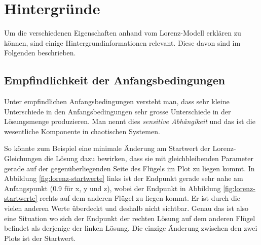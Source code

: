 
\section{Hintergründe}\label{backgroundinfo}
Um die verschiedenen Eigenschaften anhand vom Lorenz-Modell erklären zu können, sind einige Hintergrundinformationen relevant. Diese davon sind im Folgenden beschrieben.

\subsection{Empfindlichkeit der Anfangsbedingungen}
Unter empfindlichen Anfangsbedingungen versteht man, dass sehr kleine Unterschiede in den Anfangsbedingungen sehr grosse Unterschiede in der Lösungsmenge produzieren. Man nennt dies \textit{sensitive Abhängikeit} und das ist die wesentliche Komponente in chaotischen Systemen. 

So könnte zum Beispiel eine minimale Änderung am Startwert der Lorenz-Gleichungen die Lösung dazu bewirken, dass sie mit gleichbleibenden Parameter gerade auf der gegenüberliegenden Seite des Flügels im Plot zu liegen kommt. In Abbildung \ref{fig:lorenz-startwerte} links ist der Endpunkt gerade sehr nahe am Anfangspunkt (0.9 für x, y und z), wobei der Endpunkt in Abbildung \ref{fig:lorenz-startwerte} rechts auf dem anderen Flügel zu liegen kommt. Er ist durch die vielen anderen Werte überdeckt und deshalb nicht sichtbar. Genau das ist also eine Situation wo sich der Endpunkt der rechten Lösung auf dem anderen Flügel befindet als derjenige der linken Lösung. Die einzige Änderung zwischen den zwei Plots ist der Startwert.

